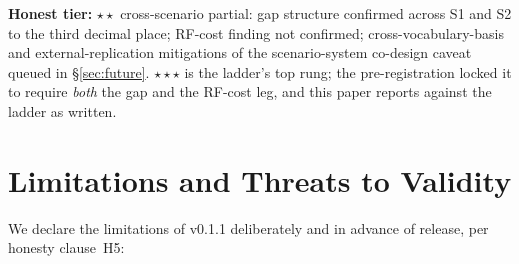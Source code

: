\documentclass[11pt,a4paper]{article}
\begin{document}
\textbf{Honest tier:} $\star\star$ cross-scenario partial: gap structure confirmed across S1 and S2 to the third decimal place; RF-cost finding not confirmed; cross-vocabulary-basis and external-replication mitigations of the scenario-system co-design caveat queued in §\ref{sec:future}. $\star\star\star$ is the ladder's top rung; the pre-registration locked it to require \emph{both} the gap and the RF-cost leg, and this paper reports against the ladder as written.

\section{Limitations and Threats to Validity}
\label{sec:limits}

We declare the limitations of v0.1.1 deliberately and in advance of release, per honesty clause~H5:
\end{document}
